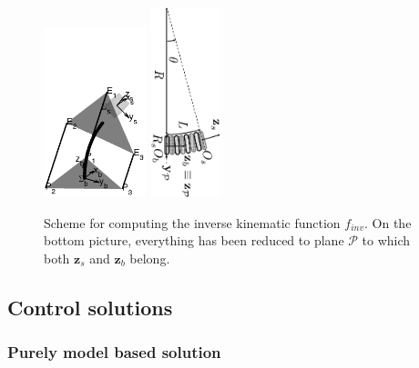 \documentclass[conference]{IEEEtran}
\numberwithin{equation}{section}
\begin{document}
\begin{figure}[tbp]
\centering
\includegraphics[width=30mm]{image/NeckModel.pdf} 
\includegraphics[width=20mm, angle=90]{image/NeckModelCalc.pdf} 
\caption{Scheme for computing the inverse kinematic function $f_{inv}$. On the bottom picture, everything has been reduced to plane $\mathcal P$ to which both $\mathbf z_s$ and $\mathbf z_b$ belong.}
\label{Fig:HeadActCalc}
\end{figure}

\subsection{Control solutions} \label{Sec:ControlSolutions}

\subsubsection{Purely model based solution} \label{Sec:ModelBasedSolution}
\end{document}
